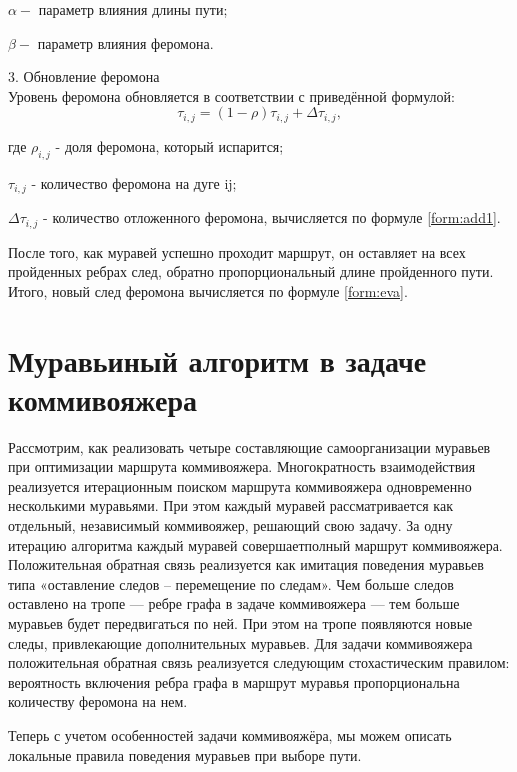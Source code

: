 \documentclass[12pt]{report}
\begin{document}
$\alpha - $ параметр влияния длины пути;

$\beta - $ параметр влияния феромона.

\vspace{\baselineskip}

3. Обновление феромона \\
Уровень феромона обновляется в соответствии с приведённой формулой:\\
\begin{equation}\label{form:eva} 
	\tau _{i,j}=(1-\rho )\tau _{i,j}+\Delta \tau _{i,j},
\end{equation}

где $ \rho_{i,j}$ - доля феромона, который испарится; 

$\tau_{i,j}$ - количество феромона на дуге ij; 

$\Delta \tau_{i,j}$ - количество отложенного феромона, вычисляется по формуле \ref{form:add1}.

\vspace{\baselineskip}

После того, как муравей успешно проходит маршрут, он оставляет на всех пройденных ребрах след, обратно пропорциональный длине пройденного пути. Итого, новый след феромона вычисляется по формуле \ref{form:eva}.

\section{Муравьиный алгоритм в задаче коммивояжера}

Рассмотрим, как реализовать четыре составляющие самоорганизации муравьев при оптимизации маршрута коммивояжера. Многократность взаимодействия реализуется итерационным поиском маршрута коммивояжера одновременно несколькими муравьями. При этом каждый муравей рассматривается как отдельный, независимый коммивояжер, решающий свою задачу. За одну итерацию алгоритма каждый муравей совершаетполный маршрут коммивояжера. Положительная обратная связь реализуется как имитация поведения муравьев типа «оставление следов – перемещение по следам». Чем больше следов оставлено на тропе — ребре графа в задаче коммивояжера  — тем больше муравьев будет передвигаться по ней. При этом на тропе появляются новые следы, привлекающие дополнительных муравьев. Для задачи коммивояжера положительная обратная связь реализуется следующим стохастическим правилом: вероятность включения ребра графа в маршрут муравья пропорциональна количеству феромона на нем.

Теперь с учетом особенностей задачи коммивояжёра, мы можем описать локальные правила поведения муравьев при выборе пути.\\
\end{document}
